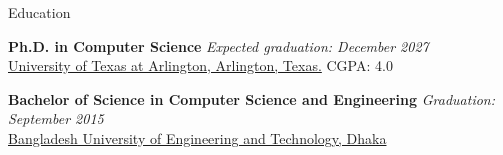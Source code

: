 
\begin{rSection}{Education}

{\bf Ph.D. in Computer Science} \hfill {\em Expected graduation: December 2027}
\\ \href{https://www.uta.edu/academics/schools-colleges/engineering/academics/departments/cse}{University of Texas at Arlington, Arlington, Texas.} \hfill{CGPA: 4.0}


{\bf Bachelor of Science in Computer Science and Engineering} \hfill {\em Graduation: September 2015}
\\ \href{https://www.buet.ac.bd/web/}{Bangladesh University of Engineering and Technology, Dhaka}

\end{rSection}